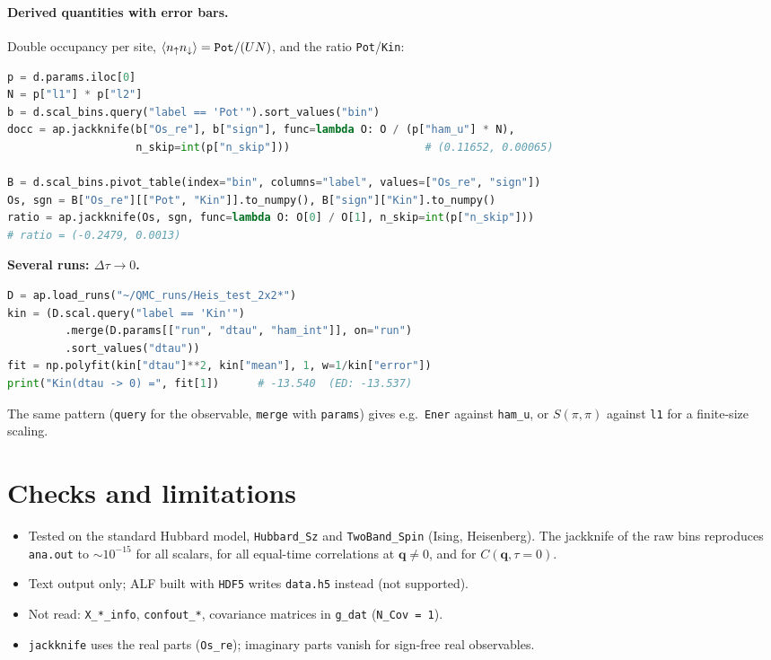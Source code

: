 \documentclass[11pt,a4paper]{article}
\newcommand{\f}[1]{\texttt{#1}}
\begin{document}
\paragraph{Derived quantities with error bars.}
Double occupancy per site, $\langle n_\uparrow n_\downarrow\rangle=\text{\f{Pot}}/(UN)$, and the
ratio \f{Pot}/\f{Kin}:
\begin{lstlisting}[language=Python]
p = d.params.iloc[0]
N = p["l1"] * p["l2"]
b = d.scal_bins.query("label == 'Pot'").sort_values("bin")
docc = ap.jackknife(b["Os_re"], b["sign"], func=lambda O: O / (p["ham_u"] * N),
                    n_skip=int(p["n_skip"]))                     # (0.11652, 0.00065)

B = d.scal_bins.pivot_table(index="bin", columns="label", values=["Os_re", "sign"])
Os, sgn = B["Os_re"][["Pot", "Kin"]].to_numpy(), B["sign"]["Kin"].to_numpy()
ratio = ap.jackknife(Os, sgn, func=lambda O: O[0] / O[1], n_skip=int(p["n_skip"]))
# ratio = (-0.2479, 0.0013)
\end{lstlisting}

\textbf{Several runs: $\Delta\tau\to0$.}\par
\begin{lstlisting}[language=Python]
D = ap.load_runs("~/QMC_runs/Heis_test_2x2*")
kin = (D.scal.query("label == 'Kin'")
         .merge(D.params[["run", "dtau", "ham_int"]], on="run")
         .sort_values("dtau"))
fit = np.polyfit(kin["dtau"]**2, kin["mean"], 1, w=1/kin["error"])
print("Kin(dtau -> 0) =", fit[1])      # -13.540  (ED: -13.537)
\end{lstlisting}
The same pattern (\f{query} for the observable, \f{merge} with \f{params}) gives e.g.\
\f{Ener} against \f{ham\_u}, or $S(\pi,\pi)$ against \f{l1} for a finite-size scaling.

\section{Checks and limitations}
\begin{itemize}
  \item Tested on the standard Hubbard model, \f{Hubbard\_Sz} and \f{TwoBand\_Spin}
        (Ising, Heisenberg). The jackknife of the raw bins reproduces \f{ana.out} to
        $\sim10^{-15}$ for all scalars, for all equal-time correlations at $\mathbf q\neq0$, and
        for $C(\mathbf q,\tau=0)$.
  \item Text output only; ALF built with \f{HDF5} writes \f{data.h5} instead (not supported).
  \item Not read: \f{X\_*\_info}, \f{confout\_*}, covariance matrices in \f{g\_dat}
        (\f{N\_Cov = 1}).
  \item \f{jackknife} uses the real parts (\f{Os\_re}); imaginary parts vanish for sign-free
        real observables.
\end{itemize}
\end{document}
